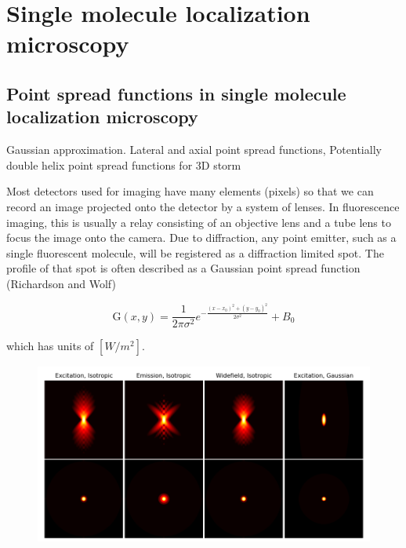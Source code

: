 \documentclass{ucetd}
\begin{document}
\clearpage

\mainmatter

\chapter{Single molecule localization microscopy}

\section{Point spread functions in single molecule localization microscopy}

Gaussian approximation. Lateral and axial point spread functions, Potentially double helix point spread functions for 3D storm

Most detectors used for imaging have many elements (pixels) so that we can record an image projected onto the detector by a system of lenses. In fluorescence imaging, this is usually a relay consisting of an objective lens and a tube lens to focus the image onto the camera. Due to diffraction, any point emitter, such as a single fluorescent molecule, will be registered as a diffraction limited spot. The profile of that spot is often described as a Gaussian point spread function (Richardson and Wolf)

\begin{equation}
\mathrm{G}(x,y) = \frac{1}{2\pi\sigma^{2}}e^{-\frac{(x-x_{0})^{2}+(y-y_{0})^{2}}{2\sigma^{2}}} + B_0
\end{equation}

which has units of $[W/m^{2}]$.

\begin{figure}[t!]
\centering
\includegraphics[width=150mm]{psf-1}
\end{figure}
\end{document}
